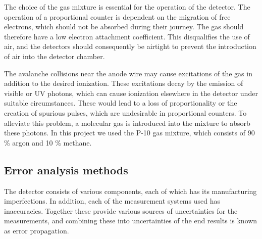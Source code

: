 \documentclass[a4paper]{article}
\begin{document}
The choice of the gas mixture is essential for the operation of the detector.
The operation of a proportional counter is dependent on the migration of free electrons, which should not be absorbed during their journey.
The gas should therefore have a low electron attachment coefficient.
This disqualifies the use of air, and the detectors should consequently be airtight to prevent the introduction of air into the detector chamber.
\cite[p. 167--168]{knoll_radiation_2010}

The avalanche collisions near the anode wire may cause excitations of the gas in addition to the desired ionization.
These excitations decay by the emission of visible or UV photons, which can cause ionization elsewhere in the detector under suitable circumstances.
These would lead to a loss of proportionality or the creation of spurious pulses, which are undesirable in proportional counters.
To alleviate this problem, a molecular gas is introduced into the mixture to absorb these photons.
In this project we used the P-10 gas mixture, which consists of 90 \% argon and 10 \% methane.
\cite[p. 168]{knoll_radiation_2010}





\subsection{Error analysis methods}
\label{error_analysis}
The detector consists of various components, each of which has its manufacturing imperfections.
In addition, each of the measurement systems used has inaccuracies.
Together these provide various sources of uncertainties for the measurements, and combining these into uncertainties of the end results is known as error propagation.
\end{document}
